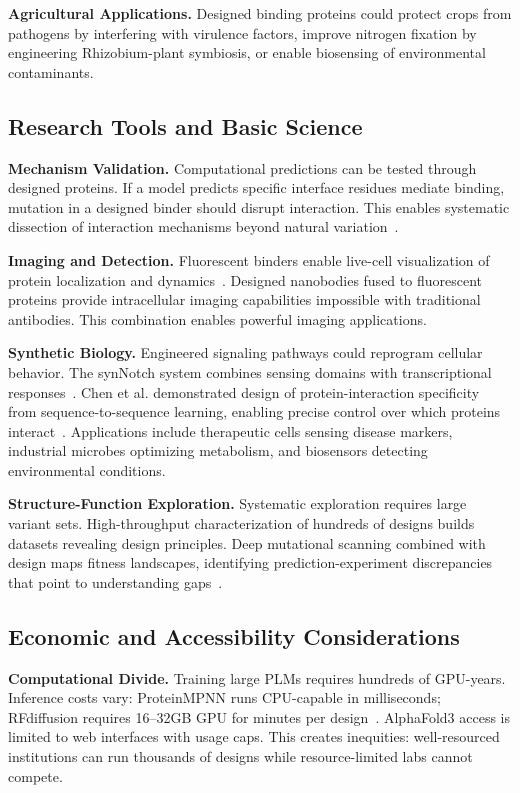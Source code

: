 \textbf{Agricultural Applications.} Designed binding proteins could protect crops from pathogens by interfering with virulence factors, improve nitrogen fixation by engineering Rhizobium-plant symbiosis, or enable biosensing of environmental contaminants.

\subsection{Research Tools and Basic Science}

\textbf{Mechanism Validation.} Computational predictions can be tested through designed proteins. If a model predicts specific interface residues mediate binding, mutation in a designed binder should disrupt interaction. This enables systematic dissection of interaction mechanisms beyond natural variation~\cite{watson2023rfdiffusion}.

\textbf{Imaging and Detection.} Fluorescent binders enable live-cell visualization of protein localization and dynamics~\cite{zhang2024nanobody}. Designed nanobodies fused to fluorescent proteins provide intracellular imaging capabilities impossible with traditional antibodies. This combination enables powerful imaging applications.

\textbf{Synthetic Biology.} Engineered signaling pathways could reprogram cellular behavior. The synNotch system combines sensing domains with transcriptional responses~\cite{morsut2016synnotch}. Chen et al. demonstrated design of protein-interaction specificity from sequence-to-sequence learning, enabling precise control over which proteins interact~\cite{chen2019design}. Applications include therapeutic cells sensing disease markers, industrial microbes optimizing metabolism, and biosensors detecting environmental conditions.

\textbf{Structure-Function Exploration.} Systematic exploration requires large variant sets. High-throughput characterization of hundreds of designs builds datasets revealing design principles. Deep mutational scanning combined with design maps fitness landscapes, identifying prediction-experiment discrepancies that point to understanding gaps~\cite{goldenzweig2016protein}.

\subsection{Economic and Accessibility Considerations}

\textbf{Computational Divide.} Training large PLMs requires hundreds of GPU-years. Inference costs vary: ProteinMPNN runs CPU-capable in milliseconds; RFdiffusion requires 16--32GB GPU for minutes per design~\cite{watson2023rfdiffusion}. AlphaFold3 access is limited to web interfaces with usage caps. This creates inequities: well-resourced institutions can run thousands of designs while resource-limited labs cannot compete.

